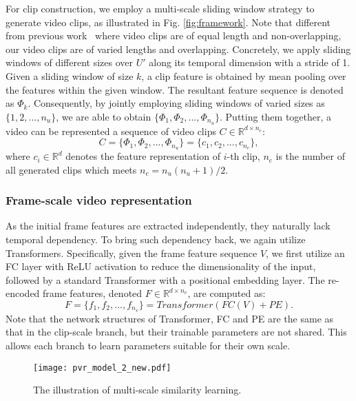 \documentclass[sigconf]{acmart}
\begin{document}
For clip construction, we employ a multi-scale sliding window strategy to generate video clips, as illustrated in Fig. \ref{fig:framework}.
Note that different from previous work~\cite{zhang2020hierarchical} where video clips are of equal length and non-overlapping, our video clips are of varied lengths and overlapping.
Concretely, we apply sliding windows of different sizes over $U'$  along its temporal dimension with a stride of 1. 
Given a sliding window of size $k$, a clip feature is obtained by mean pooling over the features within the given window. The resultant feature sequence is denoted as $\Phi_k$.
Consequently, by jointly employing sliding windows of varied sizes as $\{1, 2, ..., n_u\}$, we are able to obtain $\{\Phi_1, \Phi_2, ..., \Phi_{n_u}\}$. 
Putting them together, a video can be represented a sequence of video clips $C\in\mathbb{R}^{d\times{n_c}}$:
\begin{equation}
C= \{\Phi_1, \Phi_2, ..., \Phi_{n_u}\} = \{c_1, c_2, ..., c_{n_c}\},
\end{equation}
where $c_i \in\mathbb{R}^d$ denotes the feature representation of $i$-th clip, $n_c$ is the number of all generated clips which meets ${n_c}={n_u}({{n_u}+1})/2$.




\subsubsection{Frame-scale video representation}
As the initial frame features are extracted independently, they naturally lack temporal dependency. To bring such dependency back,  we again utilize Transformers. 
Specifically, given the frame feature sequence $V$, we first utilize an FC layer with ReLU activation to reduce the dimensionality of the input, followed by a standard Transformer with a positional embedding layer. The re-encoded frame features, denoted $F\in\mathbb{R}^{d\times{n_v}}$, are computed as:  
\begin{equation}
        F = \{f_1, f_2, ..., f_{n_v}\}=Transformer(FC(V)+PE).
\end{equation}
Note that the network structures of Transformer, FC and PE are the same as that in the clip-scale branch, but their trainable parameters are not shared. This allows each branch to learn parameters suitable for their own scale.



\begin{figure}[tb!]
\centering\texttt{[image: pvr\_model\_2\_new.pdf]}
\vspace{-8mm}
\caption{The illustration of multi-scale similarity learning. }\label{fig:ms-sl}
\end{figure}
\end{document}
